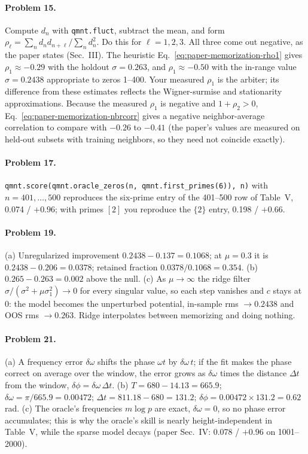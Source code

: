 \paragraph{Problem 15.} Compute $d_n$ with \texttt{qmnt.fluct}, subtract the mean, and form $\rho_\ell=\sum_n d_nd_{n+\ell}/\sum_nd_n^2$. Do this for $\ell=1,2,3$. All three come out negative, as the paper states (Sec.~III). The heuristic Eq.~\eqref{eq:paper-memorization-rho1} gives $\rho_1\approx-0.29$ with the holdout $\sigma=0.263$, and $\rho_1\approx-0.50$ with the in-range value $\sigma=0.2438$ appropriate to zeros 1--400. Your measured $\rho_1$ is the arbiter; its difference from these estimates reflects the Wigner-surmise and stationarity approximations. Because the measured $\rho_1$ is negative and $1+\rho_2>0$, Eq.~\eqref{eq:paper-memorization-nbrcorr} gives a negative neighbor-average correlation to compare with $-0.26$ to $-0.41$ (the paper's values are measured on held-out subsets with training neighbors, so they need not coincide exactly).

\paragraph{Problem 17.} \texttt{qmnt.score(qmnt.oracle\_zeros(n, qmnt.first\_primes(6)), n)} with $n=401,\dots,500$ reproduces the six-prime entry of the 401--500 row of Table~V, 0.074 / $+0.96$; with primes $[2]$ you reproduce the $\{2\}$ entry, 0.198 / $+0.66$.

\paragraph{Problem 19.} (a) Unregularized improvement $0.2438-0.137=0.1068$; at $\mu=0.3$ it is $0.2438-0.206=0.0378$; retained fraction $0.0378/0.1068=0.354$. (b) $0.265-0.263=0.002$ above the null. (c) As $\mu\to\infty$ the ridge filter $\sigma/(\sigma^2+\mu\sigma_1^2)\to0$ for every singular value, so each step vanishes and $c$ stays at 0: the model becomes the unperturbed potential, in-sample rms $\to0.2438$ and OOS rms $\to0.263$. Ridge interpolates between memorizing and doing nothing.

\paragraph{Problem 21.} (a) A frequency error $\delta\omega$ shifts the phase $\omega t$ by $\delta\omega\,t$; if the fit makes the phase correct on average over the window, the error grows as $\delta\omega$ times the distance $\Delta t$ from the window, $\delta\phi=\delta\omega\,\Delta t$. (b) $T=680-14.13=665.9$; $\delta\omega=\pi/665.9=0.00472$; $\Delta t=811.18-680=131.2$; $\delta\phi=0.00472\times131.2=0.62$ rad. (c) The oracle's frequencies $m\log p$ are exact, $\delta\omega=0$, so no phase error accumulates; this is why the oracle's skill is nearly height-independent in Table~V, while the sparse model decays (paper Sec.~IV: 0.078 / $+0.96$ on 1001--2000).

